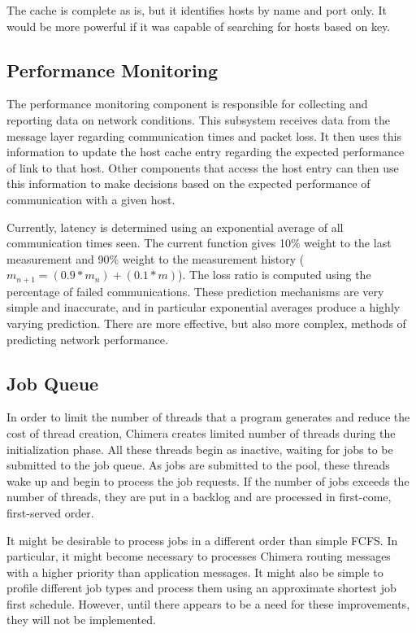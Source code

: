 The cache is complete as is, but it identifies hosts by name and port only.
It would be more powerful if it was capable of searching for hosts
based on key.

\subsection{Performance Monitoring}
\label{performance}

The performance monitoring component is responsible for collecting and
reporting data on network conditions. This subsystem receives data from
the message layer regarding communication times and packet loss. It then
uses this information to update the host cache entry regarding the expected
performance of link to that host. Other components that access the host
entry can then use this information to make decisions based on the
expected performance of communication with a given host.

Currently, latency is determined using an exponential average of all
communication times seen. The current function gives 10\% weight to the
last measurement and 90\% weight to the measurement history
($m_{n+1} = (0.9 * m_n) + (0.1 * m)$). The loss ratio is computed using
the percentage of failed communications. These prediction mechanisms are
very simple and inaccurate, and in particular exponential averages produce
a highly varying prediction. There are more effective, but also more complex,
methods of predicting network performance.

\subsection{Job Queue}
\label{jobq}

In order to limit the number of threads that a program generates and
reduce the
cost of thread creation, Chimera creates limited
number of threads during the initialization phase. All these threads begin
as inactive, waiting for jobs to be submitted to the job queue.
As jobs are submitted to the pool, these threads wake up and begin to
process the job requests. If the number of jobs exceeds the number of threads,
they are put in a backlog and are processed in first-come, first-served
order.

It might be desirable to process jobs in a different order than simple
FCFS. In particular, it might become necessary to processes Chimera routing
messages with a higher priority than application messages. It might also
be simple to profile different job types and process them using an
approximate shortest job first schedule. However, until there appears
to be a need for these improvements, they will not be implemented.

